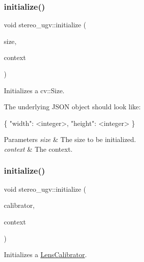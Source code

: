 \subsubsection{\texorpdfstring{initialize()}{initialize()}\hspace{0.1cm}{\footnotesize\ttfamily [5/9]}}
{\footnotesize\ttfamily void stereo\+\_\+ugv\+::initialize (\begin{DoxyParamCaption}\item[{cv\+::\+Size $\ast$}]{size,  }\item[{const \hyperlink{classstereo__ugv_1_1Context}{Context} \&}]{context }\end{DoxyParamCaption})}



Initializes a cv\+::\+Size. 

The underlying J\+S\+ON object should look like\+: 
\begin{DoxyCode}
\{
  \textcolor{stringliteral}{"width"}: <integer>,
  \textcolor{stringliteral}{"height"}: <integer>
\}
\end{DoxyCode}
 
\begin{DoxyParams}{Parameters}
{\em size} & The size to be initialized. \\
\hline
{\em context} & The context. \\
\hline
\end{DoxyParams}
\mbox{\label{namespacestereo__ugv_aab7c44a98ba3f61baec2e4c1c9802bee}} 
\subsubsection{\texorpdfstring{initialize()}{initialize()}\hspace{0.1cm}{\footnotesize\ttfamily [6/9]}}
{\footnotesize\ttfamily void stereo\+\_\+ugv\+::initialize (\begin{DoxyParamCaption}\item[{\hyperlink{classstereo__ugv_1_1LensCalibrator}{Lens\+Calibrator} $\ast$}]{calibrator,  }\item[{const \hyperlink{classstereo__ugv_1_1Context}{Context} \&}]{context }\end{DoxyParamCaption})}



Initializes a \hyperlink{classstereo__ugv_1_1LensCalibrator}{Lens\+Calibrator}. 


